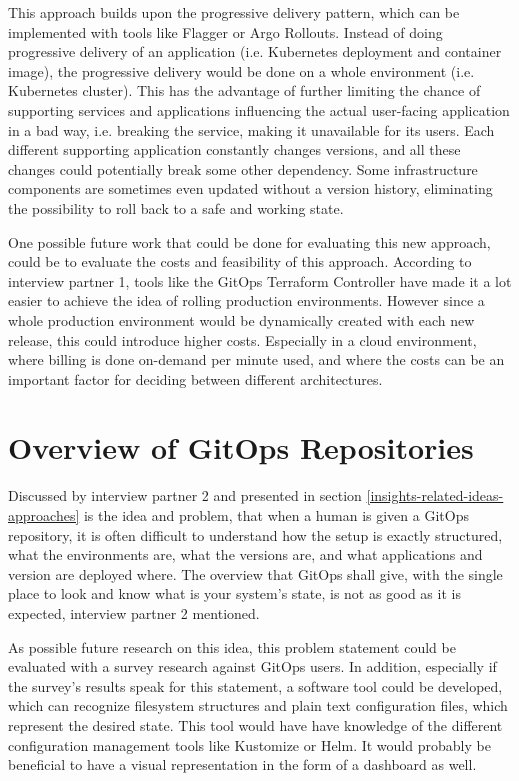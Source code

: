 This approach builds upon the progressive delivery pattern,
which can be implemented with tools like Flagger or Argo Rollouts.
Instead of doing progressive delivery of an application (i.e. Kubernetes deployment and container image),
the progressive delivery would be done on a whole environment (i.e. Kubernetes cluster).
This has the advantage of further limiting the chance of supporting services and applications
influencing the actual user-facing application in a bad way, i.e. breaking the service, making it unavailable for its users.
Each different supporting application constantly changes versions, and all these changes could potentially break some other dependency.
Some infrastructure components are sometimes even updated without a version history,
eliminating the possibility to roll back to a safe and working state.

One possible future work that could be done for evaluating this new approach,
could be to evaluate the costs and feasibility of this approach.
According to interview partner 1, tools like the GitOps Terraform Controller
have made it a lot easier to achieve the idea of rolling production environments.
However since a whole production environment would be dynamically created with each new release,
this could introduce higher costs.
Especially in a cloud environment, where billing is done on-demand per minute used,
and where the costs can be an important factor for deciding between different architectures.

\section*{Overview of GitOps Repositories}

Discussed by interview partner 2 and presented in section \ref{insights-related-ideas-approaches}
is the idea and problem, that when a human is given a GitOps repository,
it is often difficult to understand how the setup is exactly structured,
what the environments are,
what the versions are,
and what applications and version are deployed where.
The overview that GitOps shall give,
with the single place to look and know what is your system's state,
is not as good as it is expected,
interview partner 2 mentioned.

As possible future research on this idea,
this problem statement could be evaluated with a survey research against GitOps users.
In addition, especially if the survey's results speak for this statement,
a software tool could be developed,
which can recognize filesystem structures and plain text configuration files,
which represent the desired state.
This tool would have have knowledge of the different configuration management tools like Kustomize or Helm.
It would probably be beneficial to have a visual representation in the form of a dashboard as well.

